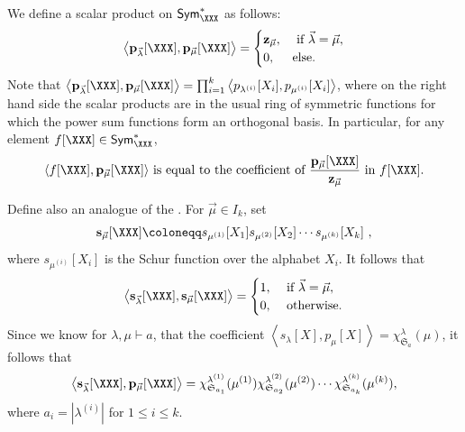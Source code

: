 We define a scalar product on $\mathsf{Sym}^\ast_{\XXX}$ as follows:
\begin{equation}\label{eq:defspsym}
    \left< \mathbf{p}_{\vec{\lambda}}[\XXX], \mathbf{p}_{\vec{\mu}}[\XXX] \right> =
    \begin{cases}\mathbf{z}_{\vec{\mu}}, &\hbox{ if }\vec{\lambda} = \vec{\mu},\\
    0,&\hbox{else.}\end{cases}
\end{equation}
Note that $\big\langle \mathbf{p}_{\vec{\lambda}}[\XXX], \mathbf{p}_{\vec{\mu}}[\XXX] \big\rangle
= \prod_{i=1}^{k} \big\langle p_{\lambda^{(i)}}[X_i], p_{\mu^{(i)}}[X_i] \big\rangle$,
where on the right hand side the scalar products are in the
usual ring of symmetric functions for which the power sum functions form an orthogonal basis.
In particular, for any element $f[\XXX] \in \mathsf{Sym}^\ast_\XXX$,
\begin{equation}
\label{eq:scalar-product-with-power-sums}
\text{$\left< f[\XXX], \mathbf{p}_{\vec{\mu}}[\XXX] \right>$ is equal
to the coefficient of $\frac{\mathbf{p}_{\vec{\mu}}[\XXX]}{\mathbf{z}_{\vec{\mu}}}$
in $f[\XXX]$.}
\end{equation}

Define also an analogue of the .  For
$\vec{\mu} \in I_k$, set
\[
    \mathbf{s}_{\vec{\mu}}[\XXX] \coloneqq
    s_{\mu^{(1)}}[X_1] s_{\mu^{(2)}}[X_2] \cdots s_{\mu^{(k)}}[X_k]~,
\]
where $s_{\mu^{(i)}}[X_i]$ is the Schur function over the alphabet $X_i$.
It follows that
\begin{equation}\label{eq:sorthonormal}
    \left< \mathbf{s}_{\vec{\lambda}}[\XXX],
    \mathbf{s}_{\vec{\mu}}[\XXX] \right> =
    \begin{cases}
    1,&\hbox{ if }\vec{\lambda} = \vec{\mu},\\
    0,&\hbox{ otherwise.}
    \end{cases}
\end{equation}
Since we know for $\lambda, \mu \vdash a$, that the coefficient $\left< s_\lambda[X], p_\mu[X] \right> = \chi^{\lambda}_{\mathfrak{S}_a}(\mu)$, 
it follows that 
\begin{equation}\label{eq:spval}
\left< \mathbf{s}_{\vec{\lambda}}[\XXX],
\mathbf{p}_{\vec{\mu}}[\XXX] \right> =
\chi^{\lambda^{(1)}}_{\mathfrak{S}_{a_1}}(\mu^{(1)})
\chi^{\lambda^{(2)}}_{\mathfrak{S}_{a_2}}(\mu^{(2)})
\cdots
\chi^{\lambda^{(k)}}_{\mathfrak{S}_{a_k}}(\mu^{(k)}),
\end{equation}
where $a_i = |\lambda^{(i)}|$ for $1 \leqslant i \leqslant k$.

